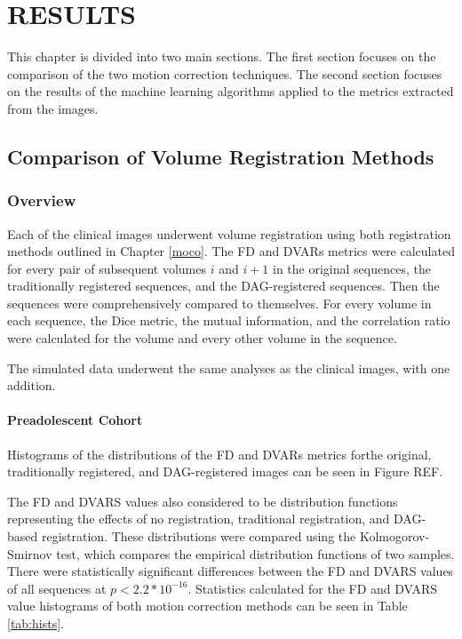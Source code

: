 \chapter{RESULTS}
\label{ch:results}

This chapter is divided into two main sections. The first section focuses on the comparison of the two motion correction techniques. The second section focuses on the results of the machine learning algorithms applied to the metrics extracted from the images.

\section{Comparison of Volume Registration Methods}

\subsection{Overview}

Each of the clinical images underwent volume registration using both registration methods outlined in Chapter \ref{moco}. The FD and DVARs metrics were calculated for every pair of subsequent volumes $i$ and $i+1$ in the original sequences, the traditionally registered sequences, and the DAG-registered sequences. Then the sequences were comprehensively compared to themselves. For every volume in each sequence, the Dice metric, the mutual information, and the correlation ratio were calculated for the volume and every other volume in the sequence.

The simulated data underwent the same analyses as the clinical images, with one addition. 

\subsubsection{Preadolescent Cohort}

Histograms of the distributions of the FD and DVARs metrics forthe original, traditionally registered, and DAG-registered images can be seen in Figure REF.

The FD and DVARS values also considered to be distribution functions representing the effects of no registration, traditional registration, and DAG-based registration. These distributions were compared using the Kolmogorov-Smirnov test, which compares the empirical distribution functions of two samples. There were statistically significant differences between the FD and DVARS values of all sequences at $p < 2.2*10^{-16}$. Statistics calculated for the FD and DVARS value histograms of both motion correction methods can be seen in Table \ref{tab:hists}.

